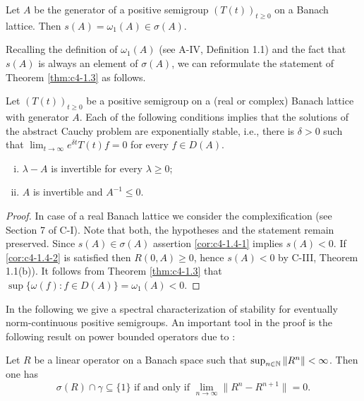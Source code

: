 \begin{theorem}\label{thm:c4-1.3}
Let $A$ be the generator of a positive semigroup $(T(t))_{t\geq 0}$ on a Banach lattice.
Then $s(A) = \omega_{1}(A) \in \sigma(A)$.
\end{theorem}
Recalling the definition of $\omega_{1}(A)$ (see A-IV, Definition 1.1) and the fact that $s(A)$ is always an element of $\sigma(A)$, we can reformulate the statement of Theorem \ref{thm:c4-1.3} as follows.
\begin{corollary}\label{cor:c4-1.4}
Let $(T(t))_{t\geq 0}$ be a positive semigroup on a (real or complex) Banach lattice with generator $A$.
Each of the following conditions implies that the solutions of the abstract Cauchy problem are exponentially stable, i.e., there is $\delta > 0$ such that $\lim_{t \to \infty} e^{\delta t}T(t)f = 0$ for every $f \in D(A)$.

\begin{enumerate}[(i)]
\item \label{cor:c4-1.4-1}
$\lambda - A$ is invertible for every $\lambda \geq 0$;
\item \label{cor:c4-1.4-2}
$A$ is invertible and $A^{-1} \leq 0$.
\end{enumerate}
\end{corollary}

\begin{proof}
In case of a real Banach lattice we consider the complexification (see Section 7 of C-I).
Note that both, the hypotheses and the statement remain preserved.
Since $s(A) \in \sigma(A)$ assertion \ref{cor:c4-1.4-1} implies $s(A) < 0$.
If \ref{cor:c4-1.4-2} is satisfied then $R(0,A) \geq 0$, hence $s(A) < 0$ by C-III, Theorem 1.1(b)).
It follows from Theorem \ref{thm:c4-1.3} that $\sup\{\omega(f) : f \in D(A)\} = \omega_{1}(A) < 0$.
\end{proof}

In the following we give a spectral characterization of stability for eventually norm-continuous positive semigroups.
An important tool in the proof is the following result on power bounded operators due to \citet{katznelsontzafriri:1984}:

Let $R$ be a linear operator on a Banach space such that $\sup_{n \in \mathbb{N}} \|R^{n}\| < \infty$.
Then one has
\begin{equation}\label{eq:c4-1.4}
\sigma(R) \cap \gamma \subseteq \{1\} \text{ if and only if } \lim_{n \to \infty} \|R^{n} - R^{n+1}\| = 0.
\end{equation}

